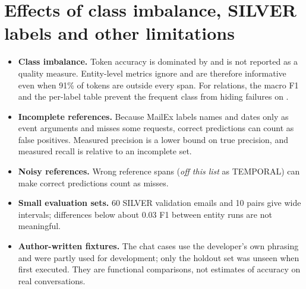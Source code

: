 \section{Effects of class imbalance, SILVER labels and other limitations}
\begin{itemize}
  \item \textbf{Class imbalance.} Token accuracy is dominated by  and is not reported as a quality measure. Entity-level metrics ignore  and are therefore informative even when 91\% of tokens are outside every span. For relations, the macro F1 and the per-label table prevent the frequent  class from hiding failures on .
  \item \textbf{Incomplete references.} Because MailEx labels names and dates only as event arguments and misses some requests, correct predictions can count as false positives. Measured precision is a lower bound on true precision, and measured recall is relative to an incomplete set.
  \item \textbf{Noisy references.} Wrong reference spans (\emph{off this list} as TEMPORAL) can make correct predictions count as misses.
  \item \textbf{Small evaluation sets.} 60 SILVER validation emails and 10  pairs give wide intervals; differences below about 0.03 F1 between entity runs are not meaningful.
  \item \textbf{Author-written fixtures.} The chat cases use the developer's own phrasing and were partly used for development; only the holdout set was unseen when first executed. They are functional comparisons, not estimates of accuracy on real conversations.
\end{itemize}
